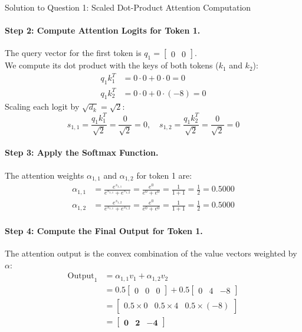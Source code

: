 \documentclass[11pt,a4paper]{article}
\begin{document}
\begin{solutionbox}{Solution to Question 1: Scaled Dot-Product Attention Computation}
\paragraph{Step 2: Compute Attention Logits for Token 1.}
The query vector for the first token is $q_1 = \begin{bmatrix} 0 & 0 \end{bmatrix}$.\\
We compute its dot product with the keys of both tokens ($k_1$ and $k_2$):
\begin{align}
    q_1 k_1^T &= 0 \cdot 0 + 0 \cdot 0 = 0 \\
    q_1 k_2^T &= 0 \cdot 0 + 0 \cdot (-8) = 0
\end{align}
Scaling each logit by $\sqrt{d_k} = \sqrt{2}$:
\begin{equation}
    s_{1,1} = \frac{q_1 k_1^T}{\sqrt{2}} = \frac{0}{\sqrt{2}} = 0, \quad
    s_{1,2} = \frac{q_1 k_2^T}{\sqrt{2}} = \frac{0}{\sqrt{2}} = 0
\end{equation}

\paragraph{Step 3: Apply the Softmax Function.}
The attention weights $\alpha_{1,1}$ and $\alpha_{1,2}$ for token 1 are:
\begin{align}
    \alpha_{1,1} &= \frac{e^{s_{1,1}}}{e^{s_{1,1}} + e^{s_{1,2}}} = \frac{e^0}{e^0 + e^0} = \frac{1}{1 + 1} = \frac{1}{2} = 0.5000 \\
    \alpha_{1,2} &= \frac{e^{s_{1,2}}}{e^{s_{1,1}} + e^{s_{1,2}}} = \frac{e^0}{e^0 + e^0} = \frac{1}{1 + 1} = \frac{1}{2} = 0.5000
\end{align}

\paragraph{Step 4: Compute the Final Output for Token 1.}
The attention output is the convex combination of the value vectors weighted by $\alpha$:
\begin{align}
    \text{Output}_1 &= \alpha_{1,1} v_1 + \alpha_{1,2} v_2 \nonumber\\
    &= 0.5 \begin{bmatrix} 0 & 0 & 0 \end{bmatrix} + 0.5 \begin{bmatrix} 0 & 4 & -8 \end{bmatrix} \nonumber\\
    &= \begin{bmatrix} 0.5 \times 0 & 0.5 \times 4 & 0.5 \times (-8) \end{bmatrix} \nonumber\\
    &= \begin{bmatrix} \mathbf{0} & \mathbf{2} & \mathbf{-4} \end{bmatrix}
\end{align}


\end{solutionbox}
\end{document}

